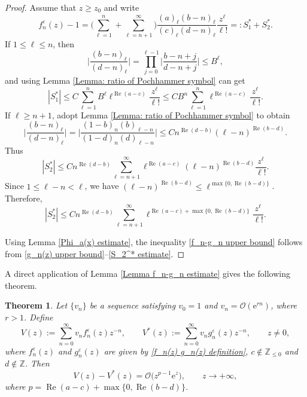 \documentclass[pdftex]{sigma}
\numberwithin{equation}{section}
\newtheorem{Theorem}{Theorem}[section]
\newcommand{\ZZ}{\ensuremath{\mathbb{Z}}}
\newcommand{\me}{\mathrm{e}}
\newcommand{\mo}{\mathcal{O}}
\begin{document}
\begin{proof}
	Assume that $z\geqslant z_0$ and write
	\[f_n^{\varepsilon}(z)-1=\Biggl(\sum_{\ell=1}^{n}+\sum_{\ell=n+1}^{\infty}\Biggr)\frac{(a)_\ell(b-n)_\ell}{(c)_\ell(d-n)_\ell}\frac{z^\ell}{\ell!}=:S_1^*+S_2^*.\]
	If $1\leqslant \ell\leqslant n$, then
	\[\biggl|\frac{(b-n)_\ell}{(d-n)_\ell}\biggr|=\prod_{j=0}^{\ell-1}\biggl|\frac{b-n+j}{d-n+j}\biggr|\leqslant B^{\ell},\]
	and using Lemma \ref{Lemma: ratio of Pochhammer symbol} can get
	\begin{equation}\label{S_1^* estimate}
		|S_1^*|\leqslant C\sum_{\ell=1}^{n}B^{\ell}\ell^{\operatorname{Re}(a-c)}\frac{z^\ell}{\ell!}\leqslant CB^n\sum_{\ell=1}^{n}\ell^{\operatorname{Re}(a-c)}\frac{z^\ell}{\ell!}.
	\end{equation}
	If $\ell\geqslant n+1$, adopt Lemma \ref{Lemma: ratio of Pochhammer symbol} to obtain
	\[\biggl|\frac{(b-n)_\ell}{(d-n)_\ell}\biggr|=\biggl|\frac{(1-b)_n(b)_{\ell-n}}{(1-d)_n(d)_{\ell-n}}\biggr|\leqslant Cn^{\operatorname{Re}(d-b)}(\ell-n)^{\operatorname{Re}(b-d)}.\]
	Thus
	\[|S_2^*|\leqslant Cn^{\operatorname{Re}(d-b)}\sum_{\ell=n+1}^{\infty}\ell^{\operatorname{Re}(a-c)}(\ell-n)^{\operatorname{Re}(b-d)}\frac{z^\ell}{\ell!}.\]
	Since $1\leqslant \ell-n<\ell$, we have $(\ell-n)^{\operatorname{Re}(b-d)}\leqslant \ell^{\max\{0,\operatorname{Re}(b-d)\}}$. Therefore,
	\begin{equation}\label{S_2^* estimate}
		|S_2^*|\leqslant Cn^{\operatorname{Re}(d-b)}\sum_{\ell=n+1}^{\infty}\ell^{\operatorname{Re}(a-c)+\max\{0,\operatorname{Re}(b-d)\}}\frac{z^\ell}{\ell!}.
	\end{equation}
	
	Using Lemma \ref{Phi_a(x) estimate}, the inequality \eqref{f_n-g_n upper bound} follows from \eqref{g_n(z) upper bound}--\eqref{S_2^* estimate}.
\end{proof}

A direct application of Lemma \ref{Lemma f_n-g_n estimate} gives the following theorem.

\begin{Theorem}\label{Theorem V(z)-V^*(z) estimate}
	Let $\{v_n\}$ be a sequence satisfying $v_0=1$ and $v_n=\mo(\me^{rn})$, where $r>1$. Define
	\[V(z):=\sum_{n=0}^{\infty}v_n f_n^{\varepsilon}(z)z^{-n},\qquad V^*(z):=\sum_{n=0}^{\infty}v_n g_n^{\varepsilon}(z)z^{-n},\qquad z\ne 0,\]
	where $f_n^{\varepsilon}(z)$ and $g_n^{\varepsilon}(z)$ are given by \eqref{f_n(z) g_n(z) definition}, $c\notin\ZZ_{\leqslant 0}$ and $d\notin\ZZ$. Then
	\[V(z)-V^*(z)=\mo\big(z^{p-1}\me^z\big),\qquad z\to +\infty,\]
	where $p=\operatorname{Re}(a-c)+\max\{0,\operatorname{Re}(b-d)\}$.
\end{Theorem}
\end{document}
